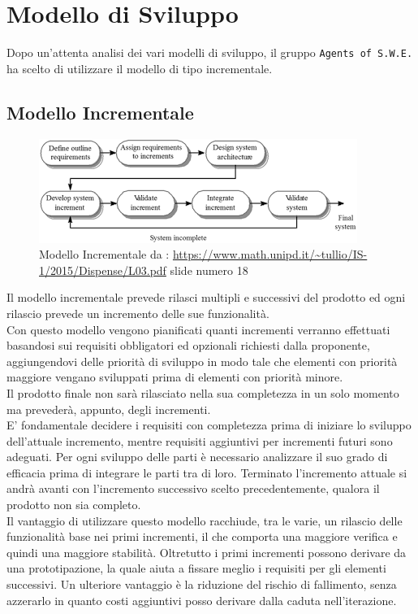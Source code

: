 \section{Modello di Sviluppo}
\label{ModelloSviluppo}

Dopo un'attenta analisi dei vari modelli di sviluppo, il gruppo \texttt{Agents of S.W.E.} ha scelto di utilizzare il modello di tipo incrementale.

\subsection{Modello Incrementale}

\begin{figure}[h]
	\centering
  		\includegraphics[width=0.7\linewidth]{./images/modelloincrementale.png}
  		\caption{Modello Incrementale da : \url{https://www.math.unipd.it/~tullio/IS-1/2015/Dispense/L03.pdf} slide numero 18}
  		\label{fig:Modello Incrementale}
\end{figure}

Il modello incrementale prevede rilasci multipli e successivi del prodotto ed ogni rilascio prevede un incremento delle sue funzionalità. \\
Con questo modello vengono pianificati quanti incrementi verranno effettuati basandosi sui requisiti obbligatori ed opzionali richiesti dalla proponente, aggiungendovi delle priorità di sviluppo in modo tale che elementi con priorità maggiore vengano sviluppati prima di elementi con priorità minore.\\
Il prodotto finale non sarà rilasciato nella sua completezza in un solo momento ma prevederà, appunto, degli incrementi. \\
E' fondamentale decidere i requisiti con completezza prima di iniziare lo sviluppo dell'attuale incremento, mentre requisiti aggiuntivi per incrementi futuri sono adeguati. Per ogni sviluppo delle parti è necessario analizzare il suo grado di efficacia prima di integrare le parti tra di loro. Terminato l'incremento attuale si andrà avanti con l'incremento successivo scelto precedentemente, qualora il prodotto non sia completo. \\
Il vantaggio di utilizzare questo modello racchiude, tra le varie, un rilascio delle funzionalità base nei primi incrementi, il che comporta una maggiore verifica e quindi una maggiore stabilità. Oltretutto i primi incrementi possono derivare da una prototipazione, la quale aiuta a fissare meglio i requisiti per gli elementi successivi. Un ulteriore vantaggio è la riduzione del rischio di fallimento, senza azzerarlo in quanto costi aggiuntivi posso derivare dalla caduta nell'iterazione\glossario.

